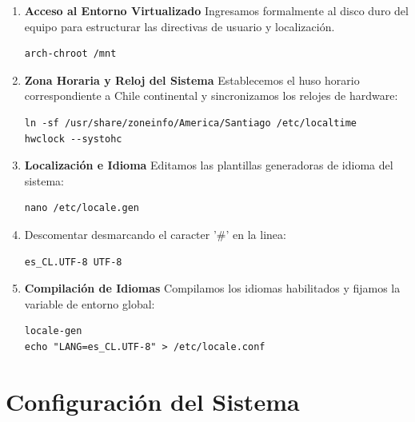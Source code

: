 \begin{enumerate}
\item [$\bullet$] \textbf{Acceso al Entorno Virtualizado}
Ingresamos formalmente al disco duro del equipo para estructurar las directivas de usuario y localización.
\begin{lstlisting}
arch-chroot /mnt
\end{lstlisting}

\item [$\bullet$] \textbf{Zona Horaria y Reloj del Sistema}
Establecemos el huso horario correspondiente a Chile continental y sincronizamos los relojes de hardware:
\begin{lstlisting}
ln -sf /usr/share/zoneinfo/America/Santiago /etc/localtime
hwclock --systohc
\end{lstlisting}

\item [$\bullet$] \textbf{Localización e Idioma}
Editamos las plantillas generadoras de idioma del sistema:
\begin{lstlisting}
nano /etc/locale.gen
\end{lstlisting}

\item [$\bullet$] Descomentar desmarcando el caracter '\#' en la linea: 
\begin{lstlisting}
es_CL.UTF-8 UTF-8
\end{lstlisting}

\item [$\bullet$] \textbf{Compilación de Idiomas}
Compilamos los idiomas habilitados y fijamos la variable de entorno global:
\begin{lstlisting}
locale-gen
echo "LANG=es_CL.UTF-8" > /etc/locale.conf
\end{lstlisting}
\end{enumerate}

\section{Configuración del Sistema}

